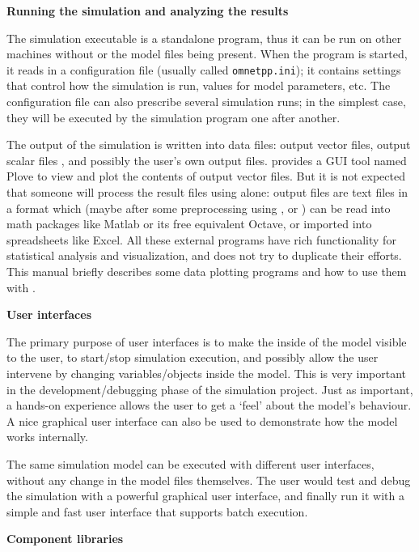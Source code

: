 \textbf{Running the simulation and analyzing the results}

The simulation executable is a standalone program,
thus it can be run on other machines without {\opp} or the model files
being present. When the program is started, it reads in a configuration
file (usually called
\texttt{omnetpp.ini}); it contains settings that
control how the simulation is run, values for model parameters, etc.
The configuration file can also prescribe several simulation runs; in
the simplest case, they will be executed by the simulation program one
after another.

The output of the simulation is written into data files: output vector
files, output scalar files
, and possibly the user's own output files.
{\opp} provides a GUI tool named Plove to view and plot the contents
of output vector files. But it is not expected that someone will
process the result files using {\opp} alone: output files are text
files in a format which (maybe after some preprocessing using
,  or ) can be read into math
packages like Matlab or its free equivalent Octave, or imported into
spreadsheets like Excel. All these external programs have rich
functionality for statistical analysis and visualization, and {\opp}
does not try to duplicate their efforts. This manual briefly describes
some data plotting programs and how to use them with {\opp}.


\textbf{User interfaces}

The primary purpose of user interfaces is to make the inside
of the model visible to the user, to start/stop simulation execution,
and possibly allow the user intervene by changing variables/objects
inside the model. This is very important in the development/debugging
phase of the simulation project. Just as important, a hands-on
experience allows the user to get a `feel' about the model's
behaviour. A nice graphical user interface can also be used to
demonstrate how the model works internally.


The same simulation model can be executed with different user
interfaces, without any change in the model files themselves.
The user would test and debug the simulation with a powerful
graphical user interface, and finally run it with a simple and
fast user interface that supports batch execution.


\textbf{Component libraries}

